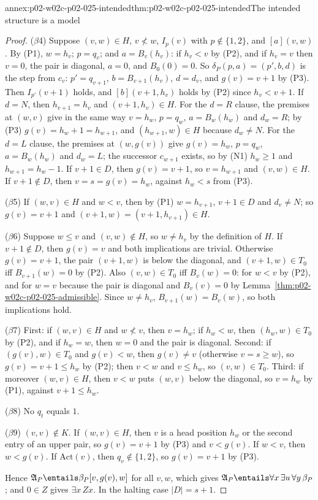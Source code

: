 \begin{annexitem}{annex:p02-w02c-p02-025-intended}{thm:p02-w02c-p02-025-intended}{The intended structure is a model}
\begin{proof}
(\(\beta\)4) Suppose \((v,w)\in H\), \(v\not<w\), \(I_p(v)\) with
\(p\notin\{1,2\}\), and \([a](v,w)\).  By (P1), \(w=h_v\); \(p=q_v\); and
\(a=B_v(h_v)\): if \(h_v<v\) by (P2), and if \(h_v=v\) then \(v=0\), the pair is
diagonal, \(a=0\), and \(B_0(0)=0\).  So \(\delta_P(p,a)=(p',b,d)\) is the step
from \(c_v\): \(p'=q_{v+1}\), \(b=B_{v+1}(h_v)\), \(d=d_v\), and
\(g(v)=v+1\) by (P3).  Then \(I_{p'}(v+1)\) holds, and \([b](v+1,h_v)\) holds by
(P2) since \(h_v<v+1\).  If \(d=N\), then \(h_{v+1}=h_v\) and
\((v+1,h_v)\in H\).  For the \(d=R\) clause, the premises at \((w,v)\) give in
the same way \(v=h_w\), \(p=q_w\), \(a=B_w(h_w)\) and \(d_w=R\); by (P3)
\(g(v)=h_w+1=h_{w+1}\), and \((h_{w+1},w)\in H\) because \(d_w\neq N\).  For the
\(d=L\) clause, the premises at \((w,g(v))\) give \(g(v)=h_w\), \(p=q_w\),
\(a=B_w(h_w)\) and \(d_w=L\); the successor \(c_{w+1}\) exists, so by (N1)
\(h_w\geq1\) and \(h_{w+1}=h_w-1\).  If \(v+1\in D\), then \(g(v)=v+1\), so
\(v=h_{w+1}\) and \((v,w)\in H\).  If \(v+1\notin D\), then \(v=s=g(v)=h_w\),
against \(h_w<s\) from (P3).

(\(\beta\)5) If \((w,v)\in H\) and \(w<v\), then by (P1) \(w=h_{v+1}\),
\(v+1\in D\) and \(d_v\neq N\); so \(g(v)=v+1\) and \((v+1,w)=(v+1,h_{v+1})\in H\).

(\(\beta\)6) Suppose \(w\leq v\) and \((v,w)\notin H\), so \(w\neq h_v\) by the
definition of \(H\).  If \(v+1\notin D\), then \(g(v)=v\) and both implications
are trivial.  Otherwise \(g(v)=v+1\), the pair \((v+1,w)\) is below the
diagonal, and \((v+1,w)\in T_0\) iff \(B_{v+1}(w)=0\) by (P2).  Also
\((v,w)\in T_0\) iff \(B_v(w)=0\): for \(w<v\) by (P2), and for \(w=v\) because
the pair is diagonal and \(B_v(v)=0\) by
Lemma~\ref{thm:p02-w02c-p02-025-admissible}.  Since \(w\neq h_v\),
\(B_{v+1}(w)=B_v(w)\), so both implications hold.

(\(\beta\)7) First: if \((w,v)\in H\) and \(w\not<v\), then \(v=h_w\); if
\(h_w<w\), then \((h_w,w)\in T_0\) by (P2), and if \(h_w=w\), then \(w=0\) and the
pair is diagonal.  Second: if \((g(v),w)\in T_0\) and \(g(v)<w\), then
\(g(v)\neq v\) (otherwise \(v=s\geq w\)), so \(g(v)=v+1\leq h_w\) by (P2); then
\(v<w\) and \(v\leq h_w\), so \((v,w)\in T_0\).  Third: if moreover
\((w,v)\in H\), then \(v<w\) puts \((w,v)\) below the diagonal, so \(v=h_w\) by
(P1), against \(v+1\leq h_w\).

(\(\beta\)8) No \(q_t\) equals \(1\).

(\(\beta\)9) \((v,v)\notin K\).  If \((w,v)\in H\), then \(v\) is a head position
\(h_w\) or the second entry of an upper pair, so \(g(v)=v+1\) by (P3) and
\(v<g(v)\).  If \(w<v\), then \(w<g(v)\).  If \(\mathrm{Act}(v)\), then
\(q_v\notin\{1,2\}\), so \(g(v)=v+1\) by (P3).

Hence \(\mathfrak A_P\entails\beta_P[v,g(v),w]\) for all \(v,w\), which gives
\(\mathfrak A_P\entails\forall x\,\exists u\,\forall y\,\beta_P\); and
\(0\in Z\) gives \(\exists x\,Zx\).  In the halting case \(\lvert D\rvert=s+1\).
\end{proof}
\end{annexitem}

